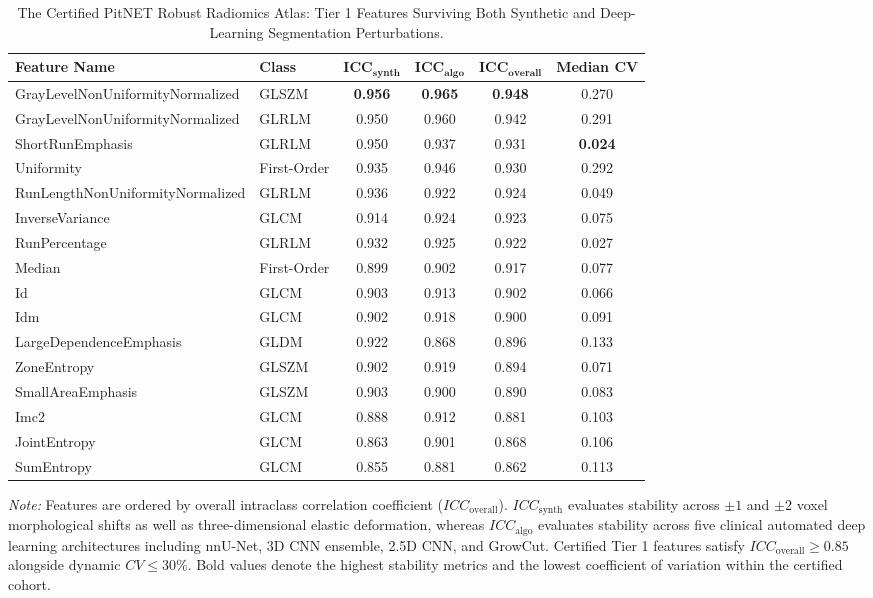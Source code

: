 \begin{table}[htbp]
\centering
\caption{The Certified PitNET Robust Radiomics Atlas: Tier 1 Features Surviving Both Synthetic and Deep-Learning Segmentation Perturbations.}
\label{tab:robust_atlas}
\small
\begin{tabular}{llcccc}
\toprule
\textbf{Feature Name} & \textbf{Class} & $\mathbf{ICC_{\text{synth}}}$ & $\mathbf{ICC_{\text{algo}}}$ & $\mathbf{ICC_{\text{overall}}}$ & \textbf{Median CV} \\
\midrule
GrayLevelNonUniformityNormalized & GLSZM & \textbf{0.956} & \textbf{0.965} & \textbf{0.948} & 0.270 \\
GrayLevelNonUniformityNormalized & GLRLM & 0.950 & 0.960 & 0.942 & 0.291 \\
ShortRunEmphasis & GLRLM & 0.950 & 0.937 & 0.931 & \textbf{0.024} \\
Uniformity & First-Order & 0.935 & 0.946 & 0.930 & 0.292 \\
RunLengthNonUniformityNormalized & GLRLM & 0.936 & 0.922 & 0.924 & 0.049 \\
InverseVariance & GLCM & 0.914 & 0.924 & 0.923 & 0.075 \\
RunPercentage & GLRLM & 0.932 & 0.925 & 0.922 & 0.027 \\
Median & First-Order & 0.899 & 0.902 & 0.917 & 0.077 \\
Id & GLCM & 0.903 & 0.913 & 0.902 & 0.066 \\
Idm & GLCM & 0.902 & 0.918 & 0.900 & 0.091 \\
LargeDependenceEmphasis & GLDM & 0.922 & 0.868 & 0.896 & 0.133 \\
ZoneEntropy & GLSZM & 0.902 & 0.919 & 0.894 & 0.071 \\
SmallAreaEmphasis & GLSZM & 0.903 & 0.900 & 0.890 & 0.083 \\
Imc2 & GLCM & 0.888 & 0.912 & 0.881 & 0.103 \\
JointEntropy & GLCM & 0.863 & 0.901 & 0.868 & 0.106 \\
SumEntropy & GLCM & 0.855 & 0.881 & 0.862 & 0.113 \\
\bottomrule
\end{tabular}
\begin{flushleft}
\footnotesize \textit{Note:} Features are ordered by overall intraclass correlation coefficient ($ICC_{\text{overall}}$). $ICC_{\text{synth}}$ evaluates stability across $\pm1$ and $\pm2$ voxel morphological shifts as well as three-dimensional elastic deformation, whereas $ICC_{\text{algo}}$ evaluates stability across five clinical automated deep learning architectures including nnU-Net, 3D CNN ensemble, 2.5D CNN, and GrowCut. Certified Tier 1 features satisfy $ICC_{\text{overall}} \ge 0.85$ alongside dynamic $CV \le 30\%$. Bold values denote the highest stability metrics and the lowest coefficient of variation within the certified cohort.
\end{flushleft}
\end{table}
